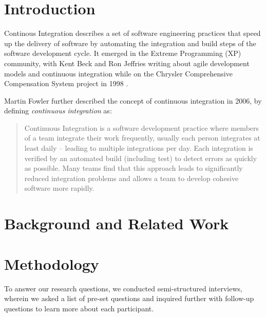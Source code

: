 \documentclass{sig-alternate-05-2015}
\begin{document}


\section{Introduction}
Continous Integration describes a set of software engineering practices that speed up the delivery of software by automating the integration and build steps of the software development cycle. It emerged in the Extreme Programming (XP) community, with Kent Beck and Ron Jeffries writing about agile development models and continuous integration while on the Chrysler Comprehensive Compensation System project in 1998 \cite{beck:extreme_programming}\cite{beck:agile_manifesto}.

Martin Fowler further described the concept of continuous integration in 2006, by defining \textit{continuous integration} as:

\begin{quote}
Continuous Integration is a software development practice where members of a team integrate their work frequently, usually each person integrates at least daily -- leading to multiple integrations per day. Each integration is verified by an automated build (including test) to detect errors as quickly as possible. Many teams find that this approach leads to significantly reduced integration problems and allows a team to develop cohesive software more rapidly. \cite{fowler:continuous}
\end{quote}

\section{Background and Related Work}
\section{Methodology}
To answer our research questions, we conducted semi-structured interviews, wherein we asked a list of pre-set questions and inquired further with follow-up questions to learn more about each participant. \\
\end{document}
